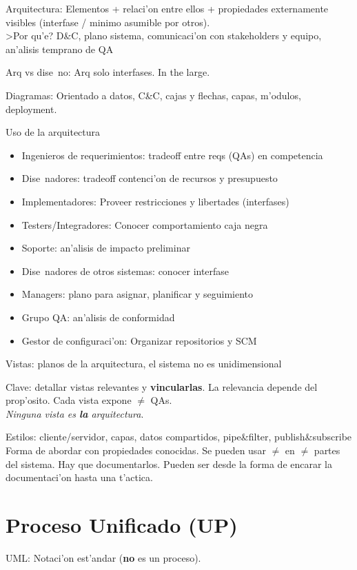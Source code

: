 \documentclass[a4paper,spanish]{article}
\newcommand{\tab}[0]{\hspace*{0.5cm}}
\begin{document}
Arquitectura: Elementos + relaci'on entre ellos + propiedades externamente 
	visibles (interfase / minimo asumible por otros). \\
\tab >Por qu'e? D\&C, plano sistema, comunicaci'on con stakeholders y equipo,
	an'alisis temprano de QA

Arq vs dise~no: Arq solo interfases. In the large.

Diagramas: Orientado a datos, C\&C, cajas y flechas, capas, m'odulos, 
	deployment.
	
Uso de la arquitectura
\begin{itemize}
\item Ingenieros de requerimientos: tradeoff entre reqs (QAs) en 
	competencia
\item Dise~nadores: tradeoff contenci'on de recursos y presupuesto
\item Implementadores: Proveer restricciones y libertades (interfases)
\item Testers/Integradores: Conocer comportamiento caja negra
\item Soporte: an'alisis de impacto preliminar
\item Dise~nadores de otros sistemas: conocer interfase
\item Managers: plano para asignar, planificar y seguimiento
\item Grupo QA: an'alisis de conformidad
\item Gestor de configuraci'on: Organizar repositorios y SCM
\end{itemize}

Vistas: planos de la arquitectura, el sistema no es unidimensional

Clave: detallar vistas relevantes y \textbf{vincularlas}. La relevancia 
	depende del prop'osito. Cada vista expone $\neq$ QAs. \\
\tab \emph{Ninguna vista es \textbf{la} arquitectura}.

Estilos: cliente/servidor, capas, datos compartidos, pipe\&filter, 
	publish\&subscribe \\
\tab Forma de abordar con propiedades conocidas. Se pueden usar $\neq$ en 
	$\neq$ partes del sistema. Hay que documentarlos. Pueden ser desde la 
	forma de encarar la documentaci'on hasta una t'actica.
	
\section{Proceso Unificado (UP)}

UML: Notaci'on est'andar (\textbf{no} es un proceso).
\end{document}
